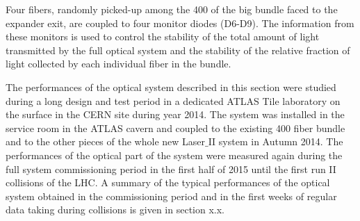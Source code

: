 Four fibers, randomly picked-up among the 400 of the big bundle faced to the
expander exit, are coupled to four monitor diodes (D6-D9). The information from
these monitors is used to control the stability of the total amount of light
transmitted by the full optical system and the stability of the relative fraction of
light collected by each individual fiber in the bundle.

The performances of the optical system described in this section were studied during
a long design and test period in a dedicated ATLAS Tile laboratory on the surface in
the CERN site during year 2014. The system was installed in the service room in the
ATLAS cavern and coupled to the existing 400 fiber bundle and to the other pieces of
the whole new Laser$\_$II system in Autumn 2014. The performances of the optical
part of the system were measured again during the full system commissioning period
in the first half of 2015 until the first run II collisions of the LHC. A summary of
the typical performances of the optical system obtained in the commissioning period
and in the first weeks of regular data taking during collisions is given in section
x.x.  


